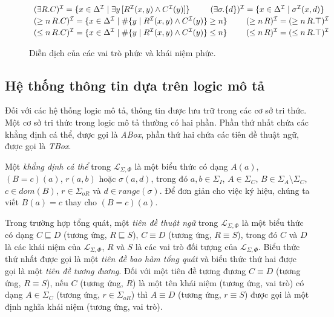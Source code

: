 \documentclass[12pt,a4paper,twoside]{report}
\newcommand{\mL}		{\mathcal{L}}
\newcommand{\mI}		{\mathcal{I}}
\newcommand{\SigmaI}	{\Sigma_I}
\newcommand{\SigmaA}	{\Sigma_A}
\newcommand{\SigmaC}	{\Sigma_C}
\newcommand{\SigmaOR}	{\Sigma_{oR}}
\newcommand{\mLSP}		{\mL_{\Sigma,\Phi}}
\newcommand{\E}			{\exists}
\newcommand{\Range}		{\mathit{range}}
\theoremstyle{definition}
\begin{document}
\begin{figure}[h!]
{\[\begin{array}{c c c}
%
  \multicolumn{3}{l}{(\E R.C)^\mI = \{ x \in \Delta^\mI \mid \E y\,[R^\mI(x,y) \wedge C^\mI(y)]\} \ \, \qquad (\E \sigma.\{d\})^\mI = \{ x \in \Delta^\mI \mid \sigma^\mI(x,d)\}} \\[0.5ex]
%
  \multicolumn{3}{l}{(\geq n\,R.C)^\mI = \{x \in \Delta^\mI \mid \#\{y \mid R^\mI(x,y) \wedge C^\mI(y)\} \geq n\} 
  \ \qquad (\geq n\,R)^\mI = (\geq n\,R.\top)^\mI} \\[0.5ex]
%
  \multicolumn{3}{l}{(\leq n\,R.C)^\mI = \{x \in \Delta^\mI \mid \#\{y \mid R^\mI(x,y) \wedge C^\mI(y)\} \leq n \}
  \ \qquad(\leq n\,R)^\mI = (\leq n\,R.\top)^\mI}
\end{array}
\vspace{-2.5ex}
\]}
\caption{Diễn dịch của các vai trò phức và khái niệm phức.\label{fig:int-comp}}
\end{figure}

\subsection{Hệ thống thông tin dựa trên logic mô tả}
Đối với các hệ thống logic mô tả, thông tin được lưu trữ trong các cơ sở tri thức. Một cơ sở tri thức trong logic mô tả thường có hai phần. Phần thứ nhất chứa các khẳng định cá thể, được gọi là {\em ABox}, phần thứ hai chứa các tiên đề thuật ngữ, được gọi là {\em TBox}.

Một {\em khẳng định cá thể} trong $\mLSP$ là một biểu thức có dạng $A(a)$, $(B=c)(a)$, $r(a,b)$ hoặc $\sigma(a,d)$, trong đó $a, b \in \SigmaI$, $A \in \SigmaC$, $B \in \SigmaA \setminus \SigmaC$, $c \in dom(B)$, $r \in \SigmaOR$ và $d \in \Range(\sigma)$.
Để đơn giản cho việc ký hiệu, chúng ta viết $B(a) = c$ thay cho $(B=c)(a)$.

Trong trường hợp tổng quát, một {\em tiên đề thuật ngữ} trong $\mLSP$ là một biểu thức có dạng $C \sqsubseteq D$ (tương ứng, $R \sqsubseteq S$), $C \equiv D$ (tương ứng, $R \equiv S$), trong đó $C$ và $D$ là các khái niệm của $\mLSP$, $R$ và $S$ là các vai trò đối tượng của $\mLSP$. 
Biểu thức thứ nhất được gọi là một {\em tiên đề bao hàm tổng quát} và biểu thức thứ hai được gọi là một {\em tiên đề tương đương}. 
Đối với một tiên đề tương đương $C \equiv D$ (tương ứng, $R \equiv S$), nếu $C$ (tương ứng, $R$) là một tên khái niệm (tương ứng, vai trò) có dạng $A \in \SigmaC$ (tương ứng, $r \in \SigmaOR$) thì $A \equiv D$ (tương ứng, $r \equiv S$) được gọi là một định nghĩa khái niệm (tương ứng, vai trò).
\end{document}
